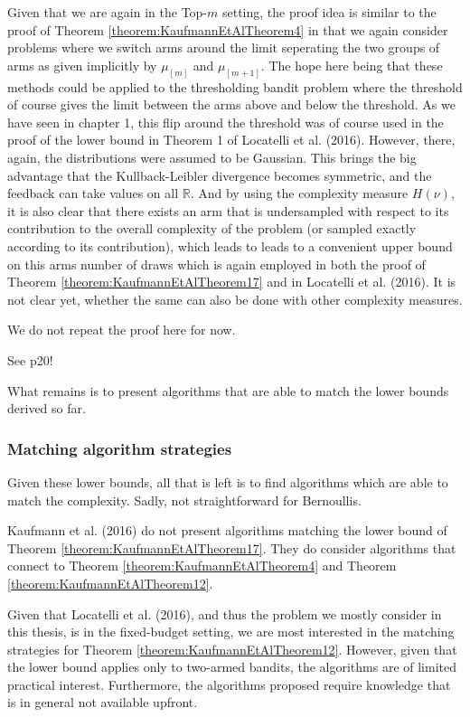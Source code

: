 \documentclass[12pt,]{article}
\begin{document}
Given that we are again in the Top-\(m\) setting, the proof idea is
similar to the proof of Theorem \ref{theorem:KaufmannEtAlTheorem4} in
that we again consider problems where we switch arms around the limit
seperating the two groups of arms as given implicitly by \(\mu_{[m]}\)
and \(\mu_{[m+1]}\). The hope here being that these methods could be
applied to the thresholding bandit problem where the threshold of course
gives the limit between the arms above and below the threshold. As we
have seen in chapter 1, this flip around the threshold was of course
used in the proof of the lower bound in Theorem 1 of Locatelli et al.
(2016). However, there, again, the distributions were assumed to be
Gaussian. This brings the big advantage that the Kullback-Leibler
divergence becomes symmetric, and the feedback can take values on all
\(\mathbb{R}\). And by using the complexity measure \(H(\nu)\), it is
also clear that there exists an arm that is undersampled with respect to
its contribution to the overall complexity of the problem (or sampled
exactly according to its contribution), which leads to leads to a
convenient upper bound on this arms number of draws which is again
employed in both the proof of Theorem
\ref{theorem:KaufmannEtAlTheorem17} and in Locatelli et al. (2016). It
is not clear yet, whether the same can also be done with other
complexity measures.

We do not repeat the proof here for now.

See p20!

What remains is to present algorithms that are able to match the lower
bounds derived so far.

\subsubsection{Matching algorithm
strategies}\label{matching-algorithm-strategies}

Given these lower bounds, all that is left is to find algorithms which
are able to match the complexity. Sadly, not straightforward for
Bernoullis.

Kaufmann et al. (2016) do not present algorithms matching the lower
bound of Theorem \ref{theorem:KaufmannEtAlTheorem17}. They do consider
algorithms that connect to Theorem \ref{theorem:KaufmannEtAlTheorem4}
and Theorem \ref{theorem:KaufmannEtAlTheorem12}.

Given that Locatelli et al. (2016), and thus the problem we mostly
consider in this thesis, is in the fixed-budget setting, we are most
interested in the matching strategies for Theorem
\ref{theorem:KaufmannEtAlTheorem12}. However, given that the lower bound
applies only to two-armed bandits, the algorithms are of limited
practical interest. Furthermore, the algorithms proposed require
knowledge that is in general not available upfront.
\end{document}
